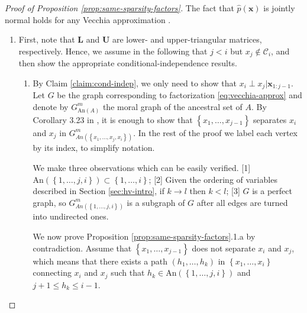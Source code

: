 \documentclass[12pt,letterpaper]{article}
\theoremstyle{propstyle}
\theoremstyle{propstyle}
\theoremstyle{propstyle}
\theoremstyle{propstyle}
\theoremstyle{propstyle}
\newcommand{\bx}{\mathbf{x}}
\newcommand{\bL}{\mathbf{L}}
\newcommand{\bU}{\mathbf{U}}
\newcommand{\condset}{\mathcal{C}}
\newcommand{\An}{\text{An}}
\begin{document}

\begin{proof}[Proof of Proposition \ref{prop:same-sparsity-factors}]

The fact that $\hat p(\bx)$ is jointly normal holds for any Vecchia approximation \citep[e.g.,][Prop.~1]{Datta2016,Katzfuss2017a}.
\begin{enumerate}
\item First, note that $\bL$ and $\bU$ are lower- and upper-triangular matrices, respectively. Hence, we assume in the following that $j < i$ but $x_j \not \in \condset_i$, and then show the appropriate conditional-independence results. 
    \begin{enumerate}
        \item
By Claim \ref{claim:cond-indep}, we only need to show that $x_i \perp x_j | \bx_{1:j-1}$. Let $G$ be the graph corresponding to factorization \eqref{eq:vecchia-approx} and denote by $G_{\An(A)}^m$ the moral graph of the ancestral set of $A$. By Corollary 3.23 in \citet{lauritzen1996graphical}, it is enough to show that $\left\{x_1, \dots, x_{j-1}\right\}$ separates $x_i$ and $x_j$ in $G_{An\left(\left\{x_1, \dots, x_j, x_i\right\}\right)}^m$. In the rest of the proof we label each vertex by its index, to simplify notation.

We make three observations which can be easily verified. [1] $\An\left(\left\{1, \dots, j, i\right\}\right) \subset \left\{1, \dots, i\right\}$; [2] Given the ordering of variables described in Section \ref{sec:hv-intro}, if $k \rightarrow l$ then $k<l$; [3] $G$ is a perfect graph, so $G_{An\left(\left\{1, \dots, j, i\right\}\right)}^m$ is a subgraph of $G$ after all edges are turned into undirected ones.

We now prove Proposition \ref{prop:same-sparsity-factors}.1.a by contradiction. Assume that $\left\{x_1, \dots, x_{j-1}\right\}$ does not separate $x_i$ and $x_j$, which means that there exists a path $(h_1, \dots, h_k)$ in $\left\{x_1, \dots, x_i\right\}$ connecting $x_i$ and $x_j$ such that $h_k \in \An(\left\{1, \dots, j, i\right\})$ and $j+1 \leq h_k \leq i-1$.


\end{enumerate}
\end{enumerate}
\end{proof}
\end{document}
